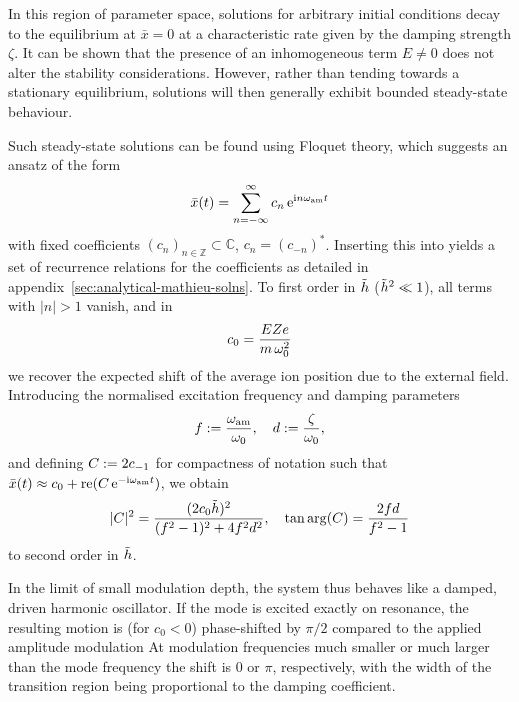 \documentclass[pra,twocolumn]{revtex4-2}
\begin{document}
In this region of parameter space, solutions for arbitrary initial conditions decay to the equilibrium at $\bar{x}= 0$ at a characteristic rate given by the damping strength $\zeta$. It can be shown \cite{slaneAnalysisPeriodicNonautonomous2011} that the presence of an inhomogeneous term $E \neq 0$ does not alter the stability considerations. However, rather than tending towards a stationary equilibrium, solutions will then generally exhibit bounded steady-state behaviour.

Such steady-state solutions can be found using Floquet theory, which suggests an ansatz of the form
\begin{equation}
	\bar{x}(t) = \sum_{n=-\infty}^{\infty} c_n\, \mathrm{e}^{\mathrm{i} n \omega_{\textrm{am}} t}
	\label{eq:ansatz}
\end{equation}
with fixed coefficients $(c_n)_{n \in \mathbb{Z}} \subset \mathbb{C}$, $c_n = \left(c_{-n}\right)^{*}$. Inserting this into  yields a set of recurrence relations for the coefficients as detailed in appendix~\ref{sec:analytical-mathieu-solns}. To first order in $\tilde{h}$ ($\tilde{h}^2 \ll 1$), all terms with $|n| > 1$ vanish, and in
\begin{equation}
	c_0 = \frac{E Z e}{m\, \omega_{\textrm{0}}^2}
\end{equation}
we recover the expected shift of the average ion position due to the external field.
Introducing the normalised excitation frequency and damping parameters
\begin{equation}
	f := \frac{\omega_{\textrm{am}}}{\omega_{\textrm{0}}}, \quad d := \frac{\zeta}{\omega_{\textrm{0}}},
\end{equation}
and defining $C := 2 c_{-1}$ for compactness of notation such that $\bar{x}(t) \approx c_0 + \operatorname{re}(C\, \mathrm{e}^{-\mathrm{i} \omega_{\textrm{am}} t})$, we obtain
\begin{equation}
	|C|^2 = \frac{(2 c_0 \tilde{h})^2}{(f^2 - 1)^2 + 4 f^2 d^2}, \quad \tan\arg(C) = \frac{2 f d}{f^2 - 1}
	\label{eq:correlated-ampl-phase}
\end{equation}
to second order in $\tilde{h}$.

In the limit of small modulation depth, the system thus behaves like a damped, driven harmonic oscillator.
If the mode is excited exactly on resonance, the resulting motion is (for $c_0 < 0$) phase-shifted by $\pi / 2$ compared to the applied amplitude modulation
At modulation frequencies much smaller or much larger than the mode frequency the shift is $0$ or $\pi$, respectively, with the width of the transition region being proportional to the damping coefficient.
\end{document}
